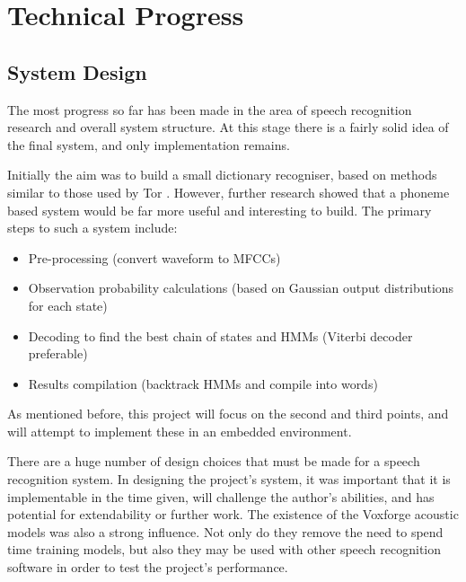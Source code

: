 \chapter{Technical Progress} %
\label{cha:technical_progress}


\section{System Design} %
\label{sec:system_design}
The most progress so far has been made in the area of speech recognition research and overall system structure.  At this stage there is a fairly solid idea of the final system, and only implementation remains.

Initially the aim was to build a small dictionary recogniser, based on methods similar to those used by Tor \cite{tor2003}.  However, further research showed that a phoneme based system would be far more useful and interesting to build.  The primary steps to such a system include:
\begin{itemize}
	\item Pre-processing (convert waveform to MFCCs)
	\item Observation probability calculations (based on Gaussian output distributions for each state)
	\item Decoding to find the best chain of states and HMMs (Viterbi decoder preferable)
	\item Results compilation (backtrack HMMs and compile into words)
\end{itemize}

As mentioned before, this project will focus on the second and third points, and will attempt to implement these in an embedded environment.

There are a huge number of design choices that must be made for a speech recognition system.  In designing the project's system, it was important that it is implementable in the time given, will challenge the author's abilities, and has potential for extendability or further work.  The existence of the Voxforge acoustic models was also a strong influence.  Not only do they remove the need to spend time training models, but also they may be used with other speech recognition software in order to test the project's performance.


